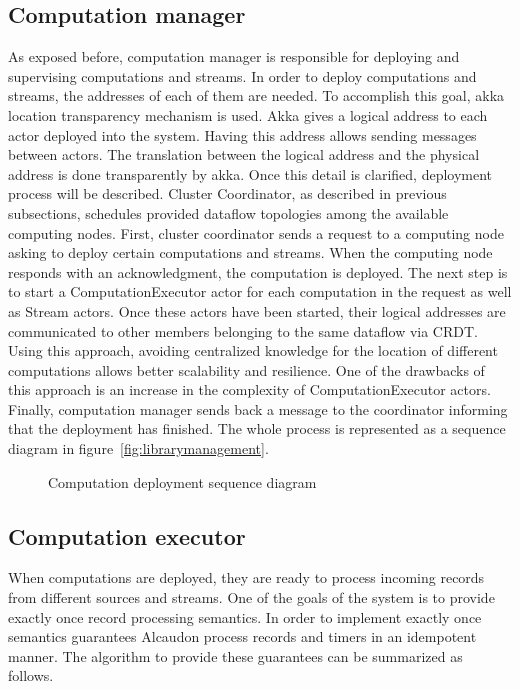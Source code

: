 \subsection{Computation manager}

As exposed before, computation manager is responsible for deploying and
supervising computations and streams. In order to deploy computations and
streams, the addresses of each of them are needed. To accomplish this
goal, akka location transparency mechanism is used. Akka gives a logical address
to each actor deployed into the system. Having this address allows sending
messages between actors. The translation between the logical address and the
physical address is done transparently by akka. Once this detail is
clarified, deployment process will be described. Cluster Coordinator, as
described in previous subsections, schedules provided dataflow topologies among
the available computing nodes. First, cluster coordinator sends a request to a
computing node asking to deploy certain computations and streams. When the computing
node responds with an acknowledgment, the computation is deployed. The next
step is to start a ComputationExecutor actor for each computation in the request
as well as Stream actors. Once these actors have been started, their logical
addresses are communicated to other members belonging to the same dataflow via
\acs{CRDT}. Using this approach, avoiding centralized knowledge for the location
of different computations allows better scalability and resilience. One of the
drawbacks of this approach is an increase in the complexity of ComputationExecutor
actors. Finally, computation manager sends back a message to the coordinator
informing that the deployment has finished. The whole process is represented as
a sequence diagram in figure~\ref{fig:librarymanagement}.

\begin{figure}[!h]
  \centering
  \scalebox{0.45}{
    
  }
  \caption{Computation deployment sequence diagram}
  \label{fig:deployment}
\end{figure}

\subsection{Computation executor}

When computations are deployed, they are ready to process incoming records from
different sources and streams. One of the goals of the system is to provide
exactly once record processing semantics. In order to implement exactly once
semantics guarantees Alcaudon process records and timers in an idempotent
manner. The algorithm to provide these guarantees can be summarized as follows.

